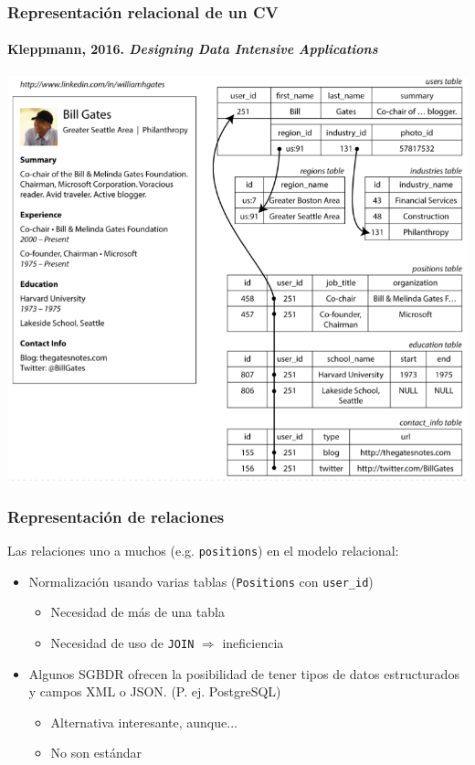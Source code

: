 \documentclass[14pt]{beamer}
\begin{document}
\begin{frame}
  \frametitle{Representación relacional de un CV}
\framesubtitle{Kleppmann, 2016. \emph{Designing Data Intensive Applications}}
  \centering\includegraphics[height=.81\textheight]{img/gates}
\end{frame}

\begin{frame}
  \frametitle{Representación de relaciones}

  Las relaciones uno a muchos (e.g. {\tt positions}) en el modelo
  relacional:

\begin{itemize}
\item Normalización usando varias tablas ({\tt Positions} con
  {\tt user\_id})
  \begin{itemize}
  \item Necesidad de más de una tabla
  \item Necesidad de uso de {\tt JOIN} $\Rightarrow$ ineficiencia
  \end{itemize}
\item Algunos SGBDR ofrecen la posibilidad de tener tipos de datos
  estructurados y campos XML o JSON. (P. ej. PostgreSQL)
  \begin{itemize}
  \item Alternativa interesante, aunque...
  \item No son estándar
  \end{itemize}
\end{itemize}
\end{frame}
\end{document}
